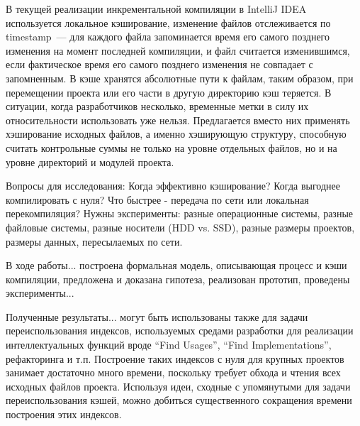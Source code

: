 В текущей реализации инкрементальной компиляции в IntelliJ IDEA используется локальное кэширование, изменение файлов отслеживается по timestamp~--- для каждого файла запоминается время его самого позднего изменения на момент последней компиляции, и файл считается изменившимся, если фактическое время его самого позднего изменения не совпадает с запомненным. В кэше хранятся абсолютные пути к файлам, таким образом, при перемещении проекта или его части в другую директорию кэш теряется. В ситуации, когда разработчиков несколько, временные метки в силу их относительности использовать уже нельзя. Предлагается вместо них применять хэширование исходных файлов, а именно хэширующую структуру, способную считать контрольные суммы не только на уровне отдельных файлов, но и на уровне директорий и модулей проекта.

Вопросы для исследования: Когда эффективно кэширование? Когда выгоднее компилировать с нуля? Что быстрее - передача по сети или локальная перекомпиляция? Нужны эксперименты: разные операционные системы, разные файловые системы, разные носители (HDD vs. SSD), разные размеры проектов, размеры данных, пересылаемых по сети.

В ходе работы... построена формальная модель, описывающая процесс и кэши компиляции, предложена и доказана гипотеза, реализован прототип, проведены эксперименты...

Полученные результаты... могут быть использованы также для задачи переиспользования индексов, используемых средами разработки для реализации интеллектуальных функций вроде ``Find Usages'', ``Find Implementations'', рефакторинга и т.п. Построение таких индексов с нуля для крупных проектов занимает достаточно много времени, поскольку требует обхода и чтения всех исходных файлов проекта. Используя идеи, сходные с упомянутыми для задачи переиспользования кэшей, можно добиться существенного сокращения времени построения этих индексов.


